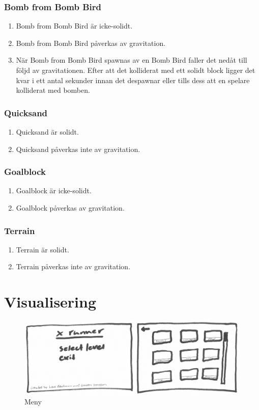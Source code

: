 \documentclass{TDP003mall}
\begin{document}
\subsubsection{Bomb from Bomb Bird}
\begin{enumerate}
\item Bomb from Bomb Bird är icke-solidt.
\item Bomb from Bomb Bird påverkas av gravitation.
\item När Bomb from Bomb Bird spawnas av en Bomb Bird faller det nedåt till följd av gravitationen. Efter att det kolliderat med ett solidt block ligger det kvar i ett antal sekunder innan det despawnar eller tills dess att en spelare kolliderat med bomben.
\end{enumerate}

\subsubsection{Quicksand}
\begin{enumerate}
\item Quicksand är solidt.
\item Quicksand påverkas inte av gravitation.
\end{enumerate}

\subsubsection{Goalblock}
\begin{enumerate}
\item Goalblock är icke-solidt.
\item Goalblock påverkas av gravitation.
\end{enumerate}

\subsubsection{Terrain}
\begin{enumerate}
\item Terrain är solidt.
\item Terrain påverkas inte av gravitation.
\end{enumerate}

\section{Visualisering}
\begin{figure}[!h]
  \centering
  \includegraphics[scale=0.20]{startmeny}
  \caption{Meny}
  \label{Meny}
\end{figure}
\end{document}
